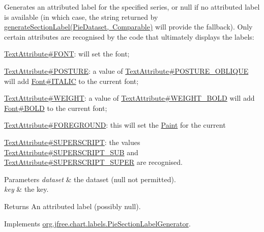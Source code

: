 Generates an attributed label for the specified series, or {\ttfamily null} if no attributed label is available (in which case, the string returned by \mbox{\hyperlink{classorg_1_1jfree_1_1chart_1_1labels_1_1_standard_pie_section_label_generator_a043e8cf227d2d5f5a457219ec6769488}{generate\+Section\+Label(\+Pie\+Dataset, Comparable)}} will provide the fallback). Only certain attributes are recognised by the code that ultimately displays the labels\+: 
\begin{DoxyItemize}
\item \mbox{\hyperlink{}{Text\+Attribute\#\+F\+O\+NT}}\+: will set the font; 
\item \mbox{\hyperlink{}{Text\+Attribute\#\+P\+O\+S\+T\+U\+RE}}\+: a value of \mbox{\hyperlink{}{Text\+Attribute\#\+P\+O\+S\+T\+U\+R\+E\+\_\+\+O\+B\+L\+I\+Q\+UE}} will add \mbox{\hyperlink{}{Font\#\+I\+T\+A\+L\+IC}} to the current font; 
\item \mbox{\hyperlink{}{Text\+Attribute\#\+W\+E\+I\+G\+HT}}\+: a value of \mbox{\hyperlink{}{Text\+Attribute\#\+W\+E\+I\+G\+H\+T\+\_\+\+B\+O\+LD}} will add \mbox{\hyperlink{}{Font\#\+B\+O\+LD}} to the current font; 
\item \mbox{\hyperlink{}{Text\+Attribute\#\+F\+O\+R\+E\+G\+R\+O\+U\+ND}}\+: this will set the \mbox{\hyperlink{}{Paint}} for the current 
\item \mbox{\hyperlink{}{Text\+Attribute\#\+S\+U\+P\+E\+R\+S\+C\+R\+I\+PT}}\+: the values \mbox{\hyperlink{}{Text\+Attribute\#\+S\+U\+P\+E\+R\+S\+C\+R\+I\+P\+T\+\_\+\+S\+UB}} and \mbox{\hyperlink{}{Text\+Attribute\#\+S\+U\+P\+E\+R\+S\+C\+R\+I\+P\+T\+\_\+\+S\+U\+P\+ER}} are recognised. 
\end{DoxyItemize}


\begin{DoxyParams}{Parameters}
{\em dataset} & the dataset ({\ttfamily null} not permitted). \\
\hline
{\em key} & the key.\\
\hline
\end{DoxyParams}
\begin{DoxyReturn}{Returns}
An attributed label (possibly {\ttfamily null}). 
\end{DoxyReturn}


Implements \mbox{\hyperlink{interfaceorg_1_1jfree_1_1chart_1_1labels_1_1_pie_section_label_generator_a3e031cb96d404cbc1736723269ca8a80}{org.\+jfree.\+chart.\+labels.\+Pie\+Section\+Label\+Generator}}.

\mbox{\label{classorg_1_1jfree_1_1chart_1_1labels_1_1_standard_pie_section_label_generator_a043e8cf227d2d5f5a457219ec6769488}} 
